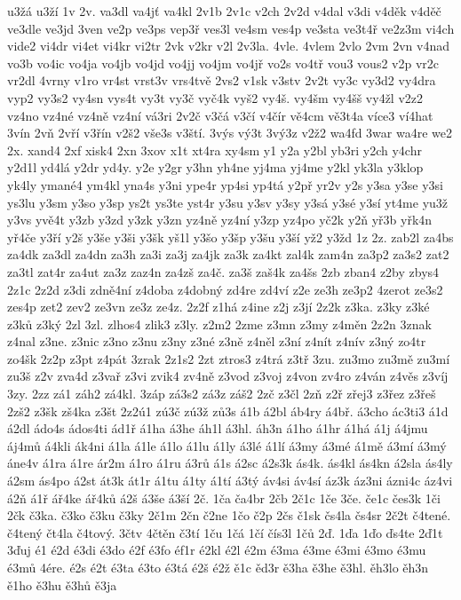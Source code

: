{u3žá
u3ží
1v
2v.
va3dl
va4jť
va4kl
2v1b
2v1c
v2ch
2v2d
v4dal
v3di
v4děk
v4děč
ve3dle
ve3jd
3ven
ve2p
ve3ps
vep3ř
ves3l
ve4sm
ves4p
ve3sta
ve3t4ř
ve2z3m
vi4ch
vide2
vi4dr
vi4et
vi4kr
vi2tr
2vk
v2kr
v2l
2v3la.
4vle.
4vlem
2vlo
2vm
2vn
v4nad
vo3b
vo4ic
vo4ja
vo4jb
vo4jd
vo4jj
vo4jm
vo4jř
vo2s
vo4tř
vou3
vous2
v2p
vr2c
vr2dl
4vrny
v1ro
vr4st
vrst3v
vrs4tvě
2vs2
v1sk
v3stv
2v2t
vy3c
vy3d2
vy4dra
vyp2
vy3s2
vy4sn
vys4t
vy3t
vy3č
vyč4k
vyš2
vy4š.
vy4šm
vy4šš
vy4žl
v2z2
vz4no
vz4né
vz4ně
vz4ní
vá3ri
2v2č
v3čá
v3čí
v4čír
vě4cm
vě3t4a
více3
ví4hat
3vín
2vň
2vří
v3řín
v2š2
vše3s
v3ští.
3výs
vý3t
3vý3z
v2ž2
wa4fd
3war
wa4re
we2
2x.
xand4
2xf
xisk4
2xn
3xov
x1t
xt4ra
xy4sm
y1
y2a
y2bl
yb3ri
y2ch
y4chr
y2d1l
yd4lá
y2dr
yd4y.
y2e
y2gr
y3hn
yh4ne
yj4ma
yj4me
y2kl
yk3la
y3klop
yk4ly
ymané4
ym4kl
yna4s
y3ni
ype4r
yp4si
yp4tá
y2př
yr2v
y2s
y3sa
y3se
y3si
ys3lu
y3sm
y3so
y3sp
ys2t
ys3te
yst4r
y3su
y3sv
y3sy
y3sá
y3sé
y3sí
yt4me
yu3ž
y3vs
yvě4t
y3zb
y3zd
y3zk
y3zn
yz4ně
yz4ní
y3zp
yz4po
yč2k
y2ň
yř3b
yřk4n
yř4če
y3ří
y2š
y3še
y3ši
y3šk
yš1l
y3šo
y3šp
y3šu
y3ší
yž2
y3žd
1z
2z.
zab2l
za4bs
za4dk
za3dl
za4dn
za3h
za3i
za3j
za4jk
za3k
za4kt
zal4k
zam4n
za3p2
za3s2
zat2
za3tl
zat4r
za4ut
za3z
zaz4n
za4zš
za4č.
za3š
zaš4k
za4šs
2zb
zban4
z2by
zbys4
2z1c
2z2d
z3di
zdně4ní
z4doba
z4dobný
zd4re
zd4ví
z2e
ze3h
ze3p2
4zerot
ze3s2
zes4p
zet2
zev2
ze3vn
ze3z
ze4z.
2z2f
z1há
z4ine
z2j
z3jí
2z2k
z3ka.
z3ky
z3ké
z3ků
z3ký
2zl
3zl.
zlhos4
zlik3
z3ly.
z2m2
2zme
z3mn
z3my
z4měn
2z2n
3znak
z4nal
z3ne.
z3nic
z3no
z3nu
z3ny
z3né
z3ně
z4něl
z3ní
z4nít
z4nív
z3ný
zo4tr
zo4šk
2z2p
z3pt
z4pát
3zrak
2z1s2
2zt
ztros3
z4trá
z3tř
3zu.
zu3mo
zu3mě
zu3mí
zu3š
z2v
zva4d
z3vař
z3vi
zvik4
zv4ně
z3vod
z3voj
z4von
zv4ro
z4ván
z4věs
z3víj
3zy.
2zz
zá1
záh2
zá4kl.
3záp
zá3s2
zá3z
záš2
2zč
z3čl
2zň
z2ř
zřej3
z3řez
z3řeš
2zš2
z3šk
zš4ka
z3št
2z2ú1
zú3č
zú3ž
zů3s
á1b
á2bl
áb4ry
á4bř.
á3cho
ác3ti3
á1d
á2dl
ádo4s
ádos4ti
ád1ř
á1ha
á3he
áh1l
á3hl.
áh3n
á1ho
á1hr
á1há
á1j
á4jmu
áj4mů
á4kli
ák4ni
á1la
á1le
á1lo
á1lu
á1ly
á3lé
á1lí
á3my
á3mé
á1mě
á3mí
á3mý
áne4v
á1ra
á1re
ár2m
á1ro
á1ru
á3rů
á1s
á2sc
á2s3k
ás4k.
ás4kl
ás4kn
á2sla
ás4ly
á2sm
ás4po
á2st
át3k
át1r
á1tu
á1ty
á1tí
á3tý
áv4si
áv4sí
áz3k
áz3ni
ázni4c
áz4vi
á2ň
á1ř
ář4ke
ář4ků
á2š
á3še
á3ší
2č.
1ča
ča4br
2čb
2č1c
1če
3če.
če1c
čes3k
1či
2čk
č3ka.
č3ko
č3ku
č3ky
2č1m
2čn
č2ne
1čo
č2p
2čs
č1sk
čs4la
čs4sr
2č2t
č4tené.
č4tený
čt4la
č4tový.
3čtv
4čtěn
č3tí
1ču
1čá
1čí
čís3l
1čů
2ď.
1ďa
1ďo
ďs4te
2ď1t
3ďuj
é1
é2d
é3di
é3do
é2f
é3fo
éf1r
é2kl
é2l
é2m
é3ma
é3me
é3mi
é3mo
é3mu
é3mů
4ére.
é2s
é2t
é3ta
é3to
é3tá
é2š
é2ž
ě1c
ěd3r
ě3ha
ě3he
ě3hl.
ěh3lo
ěh3n
ě1ho
ě3hu
ě3hů
ě3ja
}
